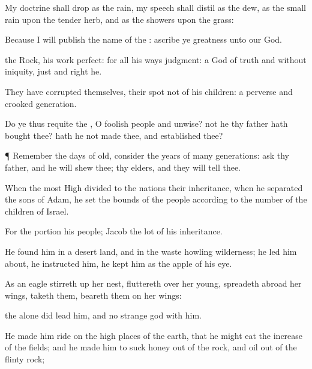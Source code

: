 {My
doctrine shall
drop as the
rain, my
speech shall
distil as the
dew, as the small
rain upon the tender
herb, and as the
showers upon the
grass:

Because I will
publish the
name of the
{}:
ascribe ye
greatness unto our
God.

 the
Rock, his
work
{}
perfect: for all his
ways
{}
judgment: a
God of
truth and without
iniquity,
just and
right
{} he.

They have
corrupted themselves, their
spot
{} not
{} of his
children:
{} a
perverse and
crooked
generation.

Do ye thus
requite the
{}, O
foolish
people and
unwise?
{} not he thy
father
{} hath
bought thee? hath he not
made thee, and
established thee?


\par }{\PP {}¶
Remember the
days of
old,
consider the
years of
many
generations:
ask thy
father, and he will
shew thee; thy
elders, and they will
tell thee.

When the most
High
divided to the
nations their
inheritance, when he
separated the
sons of
Adam, he
set the
bounds of the
people according to the
number of the
children of
Israel.

For the
{}
portion
{} his
people;
Jacob
{} the
lot of his
inheritance.

He
found him in a
desert
land, and in the
waste
howling
wilderness; he led him
about, he
instructed him, he
kept him as the
apple of his
eye.

As an
eagle stirreth
up her
nest,
fluttereth over her
young, spreadeth
abroad her
wings,
taketh them,
beareth them on her
wings:

 the
{}
alone did
lead him, and
{} no
strange
god with him.

He made him
ride on the high
places of the
earth, that he might
eat the
increase of the
fields; and he made him to
suck
honey out of the
rock, and
oil out of the
flinty
rock;

}
